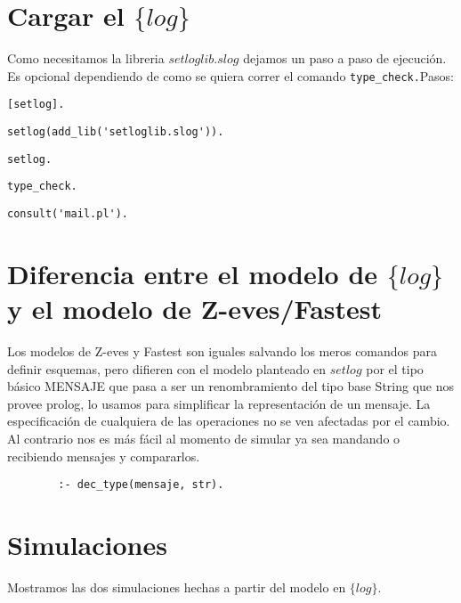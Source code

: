\section{Cargar el $\{log\}$}
Como necesitamos la libreria $setloglib.slog$ dejamos un paso a paso de ejecución. Es opcional dependiendo de como se quiera correr el comando \verb|type_check.|Pasos: 

\verb|[setlog].|

\verb|setlog(add_lib('setloglib.slog')).|

\verb|setlog.|

 \verb|type_check.|

 \verb|consult('mail.pl').|
 \section{Diferencia entre el modelo de $\{log\}$ y el modelo de Z-eves/Fastest}
Los modelos de Z-eves y Fastest son iguales salvando los meros comandos para definir esquemas, pero difieren con el modelo planteado en $setlog$ por el tipo básico MENSAJE que pasa a ser un renombramiento del tipo base String que nos provee prolog, lo usamos para simplificar la representación de un mensaje. La especificación de cualquiera de las operaciones no se ven afectadas por el cambio. Al contrario nos es más fácil al momento de simular ya sea mandando o recibiendo mensajes y compararlos.
    \begin{verbatim}
        :- dec_type(mensaje, str).
 \end{verbatim}
\section{Simulaciones}
Mostramos las dos simulaciones hechas a partir del modelo en $\{log\}$. 
